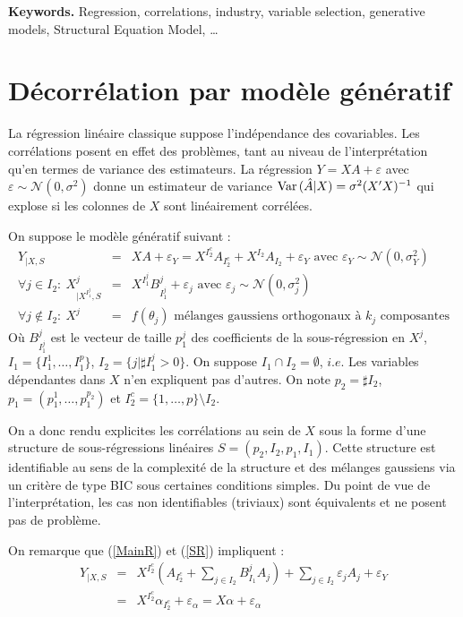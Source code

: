 \documentclass[12pt]{article}
\begin{document}
{\bf Keywords.} Regression, correlations, industry, variable selection, generative models, Structural Equation Model, \ldots


\section{Décorrélation par modèle génératif}
	La régression linéaire classique suppose l'indépendance des covariables. Les corrélations posent en effet des problèmes, tant au niveau de l'interprétation qu'en termes de variance des estimateurs. La régression $Y=XA+\varepsilon$ avec $ \varepsilon\sim \mathcal{N}(0,\sigma^2)$ donne un estimateur de variance $ {\rm Var}\,(\hat{A}|X)= \sigma^2(X'X)^{-1}$ qui explose si les colonnes de $X$ sont linéairement corrélées.
		
		On suppose le modèle génératif suivant :
	\begin{eqnarray}
	Y_{|X,S}&=&XA+\varepsilon_Y= X^{I_2^c}A_{I_2^c}+X^{I_2}A_{I_2}+\varepsilon_Y \textrm{ avec } \varepsilon_Y \sim \mathcal{N}(0,\sigma_Y^2) \label{MainR}\\
	\forall j \in I_2 : \  X^j_{|X^{I_1^j},S}&=&X^{I_1^j}B_{I_1^j}^j + \varepsilon_{j} \textrm{ avec } \varepsilon_j \sim \mathcal{N}(0,\sigma_j^2) \label{SR}\\
    \forall j \notin I_2 : \ X^j &=& f(\theta_j) \textrm{ mélanges gaussiens orthogonaux à $k_j$ composantes} 	
\end{eqnarray}
Où $B_{I_1^j}^j$ est le vecteur de taille $p_1^j$ des coefficients de la sous-régression en $X^j$, $I_1=\{I_1^1,\dots,I_1^{p}\}$, $I_2=\{j |\sharp I_1^j>0 \}$.
On suppose $I_1\cap I_2=\emptyset$, $i.e.$ Les variables dépendantes dans $X$ n'en expliquent pas d'autres.
On note $p_2= \sharp I_2$, $p_1=(p_1^1,\dots,p_1^{p_2})$ et $I_2^c=\{1,\dots,p\}\setminus I_2$.
	
On a donc rendu explicites les corrélations au sein de $X$ sous la forme d'une structure de sous-régressions linéaires $S=(p_2,I_2,p_1,I_1)$.	
Cette structure est identifiable au sens de la complexité de la structure et des mélanges gaussiens via un critère de type BIC sous certaines conditions simples. Du point de vue de l'interprétation, les cas non identifiables (triviaux) sont équivalents et ne posent pas de problème.

On remarque que (\ref{MainR}) et (\ref{SR}) impliquent :
\begin{eqnarray}
	Y_{|X,S}&=&X^{I_2^c} (A_{I_2^c}+ \sum_{j \in I_2}B^{j}_{I_1}A_{j})+  \sum_{j \in I_2}\varepsilon_{j}A_{j}+\varepsilon_Y \\
					&=& X^{I_2^c}\alpha_{I_2^c}+ \varepsilon_{\alpha}=X\alpha+ \varepsilon_{\alpha} \label{Trueexpl} 			
\end{eqnarray}
\end{document}
